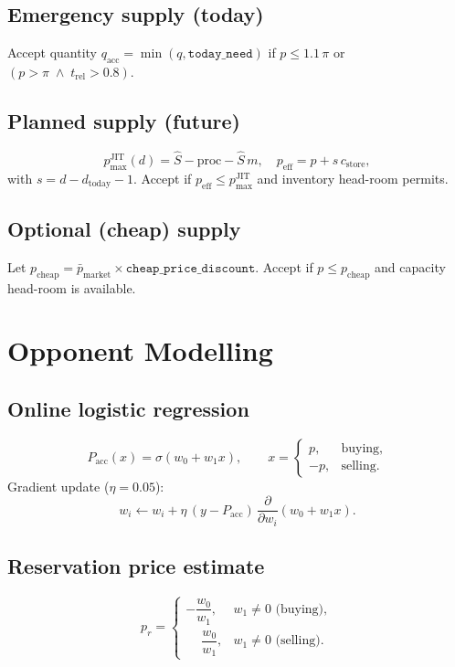 \subsection*{Emergency supply (today)}
Accept quantity \(q_{\text{acc}}=\min(q,\texttt{today\_need})\) if
\(p\le1.1\,\pi\) or \((p>\pi \;\wedge\; t_{\mathrm{rel}}>0.8)\).

\subsection*{Planned supply (future)}
\[
p_{\max}^{\mathrm{JIT}}(d)
  = \hat S - \text{proc} - \hat S\,m,
\quad
p_{\mathrm{eff}} = p + s\,c_{\mathrm{store}},
\]
with \(s=d-d_{\text{today}}-1\).
Accept if \(p_{\mathrm{eff}}\le p_{\max}^{\mathrm{JIT}}\) and inventory head-room permits.

\subsection*{Optional (cheap) supply}
Let \(p_{\text{cheap}} = \bar p_{\text{market}}\times\texttt{cheap\_price\_discount}\).
Accept if \(p\le p_{\text{cheap}}\) and capacity head-room is available.

\section{Opponent Modelling}
\subsection*{Online logistic regression}
\[
P_{\mathrm{acc}}(x)=\sigma(w_0+w_1x),
\qquad
x=\begin{cases} p,&\text{buying},\\[2pt]-p,&\text{selling}.\end{cases}
\]
Gradient update (\(\eta=0.05\)):
\[
w_i \leftarrow w_i + \eta\,(y-P_{\mathrm{acc}})\,\frac{\partial}{\partial w_i}(w_0+w_1x).
\]

\subsection*{Reservation price estimate}
\[
p_{r} =
\begin{cases}
-\dfrac{w_0}{w_1}, & w_1\neq0 \text{ (buying)},\\[6pt]
\phantom{-}\dfrac{w_0}{w_1}, & w_1\neq0 \text{ (selling)}.
\end{cases}
\]

